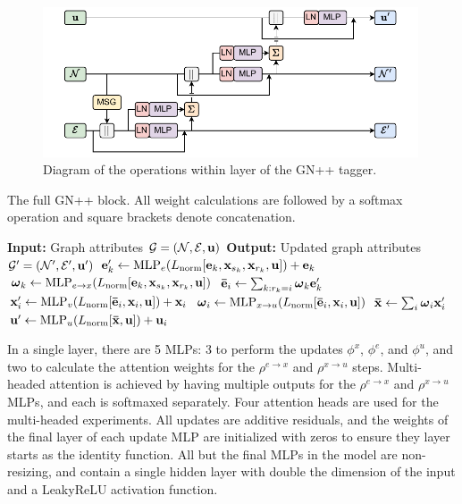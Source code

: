 \begin{figure}[h!]
    \centering
    \includegraphics[width=0.99\textwidth]{figures/flavour_tagging/gnpp.pdf}
    \caption{Diagram of the operations within layer of the GN++ tagger.}
    \label{fig:gnpp_graph}
\end{figure}

\begin{algorithm}[h!]
    \caption{The full GN++ block. All weight calculations are followed by a softmax operation and square brackets denote concatenation.}
    \label{alg:gnpp}
    \begin{algorithmic}[1]
        \State \textbf{Input:} Graph attributes $\mathcal{G} = (\mathcal{N}, \mathcal{E}, \mathbf{u})$
        \State \textbf{Output:} Updated graph attributes $\mathcal{G}' = (\mathcal{N}', \mathcal{E}', \mathbf{u}')$
        \State $\mathbf{e}_k' \gets \text{MLP}_e(L_{\text{norm}}[\mathbf{e}_k, \mathbf{x}_{s_k}, \mathbf{x}_{r_k}, \mathbf{u}]) + \mathbf{e}_k$ 
        \State $\boldsymbol{\omega}_k \gets \text{MLP}_{e \to x}(L_{\text{norm}}[\mathbf{e}_k, \mathbf{x}_{s_k}, \mathbf{x}_{r_k}, \mathbf{u}])$ 
        \EndFor
        \State $\mathbf{\bar{\mathbf{e}}}_i \gets \sum_{k: r_k = i} \boldsymbol{\omega}_k \mathbf{e}_k'$ 
        \State $\mathbf{x}_i' \gets \text{MLP}_v(L_{\text{norm}}[\mathbf{\bar{\mathbf{e}}}_i, \mathbf{x}_i, \mathbf{u}]) + \mathbf{x}_i$ 
        \State $\boldsymbol{\omega}_i \gets \text{MLP}_{x \to u}(L_{\text{norm}}[\mathbf{\bar{\mathbf{e}}}_i, \mathbf{x}_i, \mathbf{u}])$ 
        \EndFor
        \State $\mathbf{\bar{x}} \gets \sum_{i} \boldsymbol{\omega}_i \mathbf{x}_i'$ 
        \State $\mathbf{u}' \gets \text{MLP}_u(L_{\text{norm}}[\mathbf{\bar{x}}, \mathbf{u}]) + \mathbf{u}_i$ 
    \end{algorithmic}
\end{algorithm}

In a single layer, there are 5 MLPs: 3 to perform the updates $\phi^x$, $\phi^e$, and $\phi^u$, and two to calculate the attention weights for the $\rho^{e \to x}$ and $\rho^{x \to u}$ steps.
Multi-headed attention is achieved by having multiple outputs for the $\rho^{e \to x}$ and $\rho^{x \to u}$ MLPs, and each is softmaxed separately.
Four attention heads are used for the multi-headed experiments.
All updates are additive residuals, and the weights of the final layer of each update MLP are initialized with zeros to ensure they layer starts as the identity function.
All but the final MLPs in the model are non-resizing, and contain a single hidden layer with double the dimension of the input and a LeakyReLU activation function.

